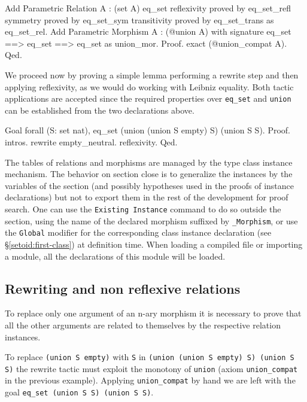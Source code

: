 \begin{coq_example*} 
Add Parametric Relation A : (set A) eq_set
 reflexivity proved by eq_set_refl
 symmetry proved by eq_set_sym
 transitivity proved by eq_set_trans
 as eq_set_rel.
Add Parametric Morphism A : (@union A) with
  signature eq_set ==> eq_set ==> eq_set as union_mor.
Proof. exact (@union_compat A). Qed.
\end{coq_example*}

We proceed now by proving a simple lemma performing a rewrite step
and then applying reflexivity, as we would do working with Leibniz
equality. Both tactic applications are accepted
since the required properties over \texttt{eq\_set} and
\texttt{union} can be established from the two declarations above.

\begin{coq_example*}
Goal forall (S: set nat),
 eq_set (union (union S empty) S) (union S S).
Proof. intros. rewrite empty_neutral. reflexivity. Qed.
\end{coq_example*}

The tables of relations and morphisms are managed by the type class
instance mechanism. The behavior on section close is to generalize
the instances by the variables of the section (and possibly hypotheses
used in the proofs of instance declarations) but not to export them in
the rest of the development for proof search. One can use the
\texttt{Existing Instance} command to do so outside the section,
using the name of the declared morphism suffixed by \texttt{\_Morphism}, 
or use the \texttt{Global} modifier for the corresponding class instance
declaration (see \S\ref{setoid:first-class}) at definition time.
When loading a compiled file or importing a module,
all the declarations of this module will be loaded.

\subsection{Rewriting and non reflexive relations}
To replace only one argument of an n-ary morphism it is necessary to prove
that all the other arguments are related to themselves by the respective
relation instances.

\begin{cscexample}
To replace \texttt{(union S empty)} with \texttt{S} in
\texttt{(union (union S empty) S) (union S S)} the rewrite tactic must
exploit the monotony of \texttt{union} (axiom \texttt{union\_compat} in
the previous example). Applying \texttt{union\_compat} by hand we are left
with the goal \texttt{eq\_set (union S S) (union S S)}.
\end{cscexample}

